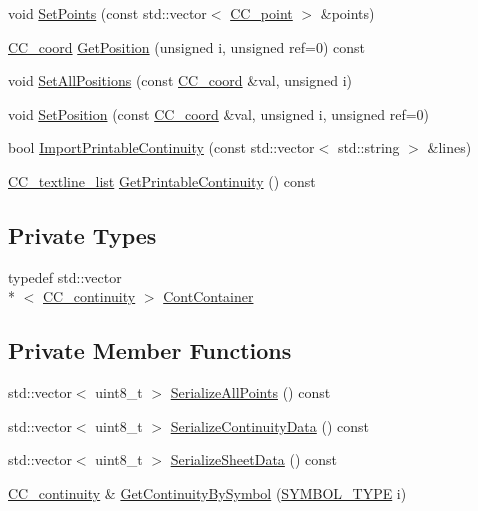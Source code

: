 \begin{DoxyCompactItemize}
\item 
void \hyperlink{a00045_ae553f706e9d0f5e4a21465b3d628e086}{Set\-Points} (const std\-::vector$<$ \hyperlink{a00034}{C\-C\-\_\-point} $>$ \&points)
\item 
\hyperlink{a00029}{C\-C\-\_\-coord} \hyperlink{a00045_acee5043c5298517ae6af21fa6d4bf418}{Get\-Position} (unsigned i, unsigned ref=0) const 
\item 
void \hyperlink{a00045_aae68e9352eaff311790b59470461886b}{Set\-All\-Positions} (const \hyperlink{a00029}{C\-C\-\_\-coord} \&val, unsigned i)
\item 
void \hyperlink{a00045_a37d4e6d9c5a8865e02292ceb40ae0a1f}{Set\-Position} (const \hyperlink{a00029}{C\-C\-\_\-coord} \&val, unsigned i, unsigned ref=0)
\item 
bool \hyperlink{a00045_a81ee7a43bdc2e9e4f119413d8c1cb575}{Import\-Printable\-Continuity} (const std\-::vector$<$ std\-::string $>$ \&lines)
\item 
\hyperlink{a00212_ae492d9b165445899a5c5a3128e58f0cf}{C\-C\-\_\-textline\-\_\-list} \hyperlink{a00045_aadb6eccd1efa0023c1d4504e38984682}{Get\-Printable\-Continuity} () const 
\end{DoxyCompactItemize}
\subsection*{Private Types}
\begin{DoxyCompactItemize}
\item 
typedef std\-::vector\\*
$<$ \hyperlink{a00027}{C\-C\-\_\-continuity} $>$ \hyperlink{a00045_a057981286a04d0a0bf0b7ecbdd5e1bcd}{Cont\-Container}
\end{DoxyCompactItemize}
\subsection*{Private Member Functions}
\begin{DoxyCompactItemize}
\item 
std\-::vector$<$ uint8\-\_\-t $>$ \hyperlink{a00045_a6167e427cbf4b3ddd6744238167802ae}{Serialize\-All\-Points} () const 
\item 
std\-::vector$<$ uint8\-\_\-t $>$ \hyperlink{a00045_aadf23b9bf05af20065bbbdeb21c58f1a}{Serialize\-Continuity\-Data} () const 
\item 
std\-::vector$<$ uint8\-\_\-t $>$ \hyperlink{a00045_a763578b37626d3f15494539a6e2c6739}{Serialize\-Sheet\-Data} () const 
\item 
\hyperlink{a00027}{C\-C\-\_\-continuity} \& \hyperlink{a00045_ac2b623ff7a5cd2c1f17c24979c56b41a}{Get\-Continuity\-By\-Symbol} (\hyperlink{a00216_a68cd84e0300be6f9ff4474682762c9ee}{S\-Y\-M\-B\-O\-L\-\_\-\-T\-Y\-P\-E} i)
\end{DoxyCompactItemize}
